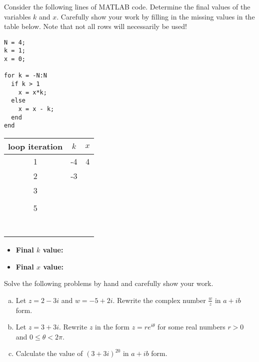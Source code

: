 \documentclass[11pt]{exam}
\theoremstyle{definition}
\begin{document}
\begin{questions}

\addpoints

\question[10]\mbox{}

Consider the following lines of MATLAB code.  Determine the final values of the variables $k$ and $x$.  Carefully show your work by filling in the missing values in the table below.  Note that not all rows will necessarily be used!

\vspace{0.5in}
\begin{lstlisting}
N = 4;
k = 1;
x = 0;

for k = -N:N
  if k > 1
    x = x*k;
  else
    x = x - k;
  end
end
\end{lstlisting}
\vspace{0.5in}

\begin{center}
\begin{tabular}{|c|c|c|}\hline
loop iteration & $k$ & $x$\\\hline
1 & -4 & 4\\\hline
2 & -3 &  \\\hline
3 &    &  \\\hline
  &    &  \\\hline
5 &    &  \\\hline
  &    &  \\\hline
  &    &  \\\hline
  &    &  \\\hline
  &    &  \\\hline
  &    &  \\\hline
  &    &  \\\hline
  &    &  \\\hline
\end{tabular}
\end{center}

\vspace{0.3in}

\begin{itemize}
\item \textbf{Final $k$ value:}
\item \textbf{Final $x$ value:}
\end{itemize}

\newpage
\question[10]\mbox{}

Solve the following problems by hand and carefully show your work.

\begin{enumerate}[(a)]
\item Let $z=2-3i$ and $w=-5+2i$.  Rewrite the complex number $\frac{w}{z}$ in $a+ib$ form.
\vspace{2.7in}
\item Let $z = 3 + 3i$.  Rewrite $z$ in the form $z = re^{i\theta}$ for some real numbers $r>0$ and $0\leq \theta < 2\pi$.
\vspace{2.7in}
\item Calculate the value of $(3+3i)^{20}$ in $a + ib$ form.
\end{enumerate}



\end{questions}
\end{document}

